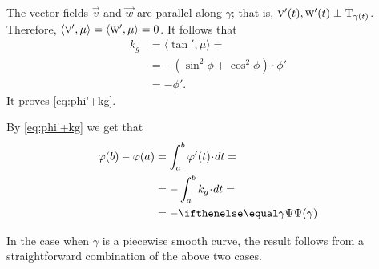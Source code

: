 The vector fields $\vec v$ and $\vec w$ are parallel along $\gamma$; that is, $\vec v'(t),\vec w'(t)\z\perp\T_{\gamma(t)}$.
Therefore, $\langle\vec v',\mu\rangle\z=\langle\vec w',\mu\rangle\z=0$.
It follows that
\begin{align*}
k_g&=\langle\tan',\mu\rangle=
\\
&=-(\sin^2\phi+\cos^2\phi)\cdot \phi'
\\
&=-\phi'.
\end{align*}
It proves \ref{eq:phi'+kg}.

By \ref{eq:phi'+kg} we get that 
\begin{align*}
\phi(b)-\phi(a)&=\int_a^b \phi'(t)\cdot dt=
\\
&=-\int_a^b k_g\cdot dt=
\\
&=-\tgc\gamma
\end{align*}

In the case when $\gamma$ is a piecewise smooth curve, the result follows from a straightforward combination of the above two cases. 
\qeds



